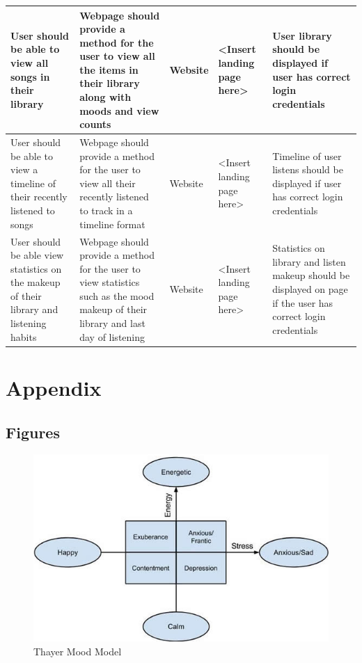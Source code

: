 \documentclass[11pt]{report}
\begin{document}
\begin{center}
\begin{longtable}{| p{2.5cm} | p{6cm} | p{2cm} | p{2cm} | p{2.5cm} | }
\hline
User should be able to view all songs in their library&
Webpage should provide a method for the user to view all the items in their library along with moods and view counts&
Website&
<Insert landing page here>&
User library should be displayed if user has correct login credentials \\
\hline
User should be able to view a timeline of their recently listened to songs&
Webpage should provide a method for the user to view all their recently listened to track in a timeline format&
Website&
<Insert landing page here>&
Timeline of user listens should be displayed if user has correct login credentials \\
\hline
User should be able view statistics on the makeup of their library and listening habits&
Webpage should provide a method for the user to view statistics such as the mood makeup of their library and last day of listening&
Website&
<Insert landing page here>&
Statistics on library and listen makeup should be displayed on page if the user has correct login credentials \\
\hline


\end{longtable}

\end{center}

\chapter{Appendix}

\section{Figures}

\begin{figure}[h]
	\includegraphics[width=\linewidth]{thayer-mood-model.png}
	\caption{Thayer Mood Model}
	\label{fig:thayermoodmodel}
\end{figure}

{}

\end{document}

